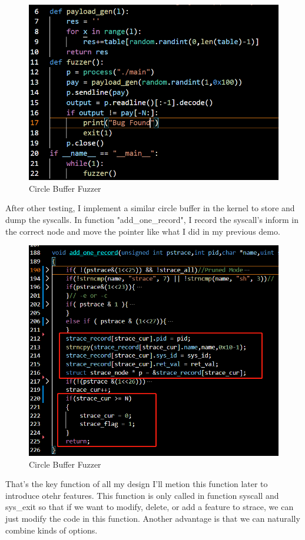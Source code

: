 \documentclass[11pt,oneside,a4paper]{article}
\begin{document}
\begin{figure}[H]
    \includegraphics[width=4.75in]{1-10.png}
    \centering
    \caption{Circle Buffer Fuzzer}
\end{figure}

After other testing, I implement a similar circle buffer in the kernel to store and 
dump the syscalls. In function "add\_one\_record", I record the syscall's inform in 
the correct node and move the pointer like what I did in my previous demo. 

\begin{figure}[H]
    \includegraphics[width=4.75in]{1-11.png}
    \centering
    \caption{Circle Buffer Fuzzer}
\end{figure}

That's the key function of all my design I'll metion this function later to introduce 
otehr features. This function is only called in function syscall and sys\_exit so that
if we want to modify, delete, or add a feature to strace, we can just modify the code 
in this function. Another advantage is that we can naturally combine kinds of options.
\end{document}
